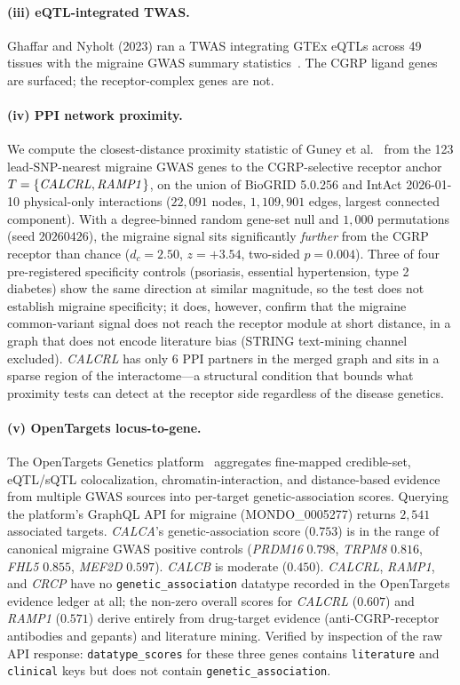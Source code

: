 \documentclass[11pt]{article}
\begin{document}
\paragraph{(iii) eQTL-integrated TWAS.} Ghaffar and Nyholt (2023) ran a TWAS integrating GTEx eQTLs across 49 tissues with the migraine GWAS summary statistics~\cite{ghaffar_2023_migraine_eqtl_twas}. The CGRP ligand genes are surfaced; the receptor-complex genes are not.

\paragraph{(iv) PPI network proximity.} We compute the closest-distance proximity statistic of Guney et al.~\cite{guney_2016_proximity} from the 123 lead-SNP-nearest migraine GWAS genes to the CGRP-selective receptor anchor $T = \{\text{\textit{CALCRL}}, \text{\textit{RAMP1}}\}$, on the union of BioGRID 5.0.256 and IntAct 2026-01-10 physical-only interactions ($22{,}091$ nodes, $1{,}109{,}901$ edges, largest connected component). With a degree-binned random gene-set null and $1{,}000$ permutations (seed $20260426$), the migraine signal sits significantly \emph{further} from the CGRP receptor than chance ($d_c = 2.50$, $z = +3.54$, two-sided $p = 0.004$). Three of four pre-registered specificity controls (psoriasis, essential hypertension, type 2 diabetes) show the same direction at similar magnitude, so the test does not establish migraine specificity; it does, however, confirm that the migraine common-variant signal does not reach the receptor module at short distance, in a graph that does not encode literature bias (STRING text-mining channel excluded). \textit{CALCRL} has only 6 PPI partners in the merged graph and sits in a sparse region of the interactome---a structural condition that bounds what proximity tests can detect at the receptor side regardless of the disease genetics.

\paragraph{(v) OpenTargets locus-to-gene.} The OpenTargets Genetics platform~\cite{ochoa_2023_opentargets} aggregates fine-mapped credible-set, eQTL/sQTL colocalization, chromatin-interaction, and distance-based evidence from multiple GWAS sources into per-target genetic-association scores. Querying the platform's GraphQL API for migraine (MONDO\_0005277) returns $2{,}541$ associated targets. \textit{CALCA}'s genetic-association score ($0.753$) is in the range of canonical migraine GWAS positive controls (\textit{PRDM16} $0.798$, \textit{TRPM8} $0.816$, \textit{FHL5} $0.855$, \textit{MEF2D} $0.597$). \textit{CALCB} is moderate ($0.450$). \textit{CALCRL}, \textit{RAMP1}, and \textit{CRCP} have no \texttt{genetic\_association} datatype recorded in the OpenTargets evidence ledger at all; the non-zero overall scores for \textit{CALCRL} ($0.607$) and \textit{RAMP1} ($0.571$) derive entirely from drug-target evidence (anti-CGRP-receptor antibodies and gepants) and literature mining. Verified by inspection of the raw API response: \texttt{datatype\_scores} for these three genes contains \texttt{literature} and \texttt{clinical} keys but does not contain \texttt{genetic\_association}.
\end{document}
